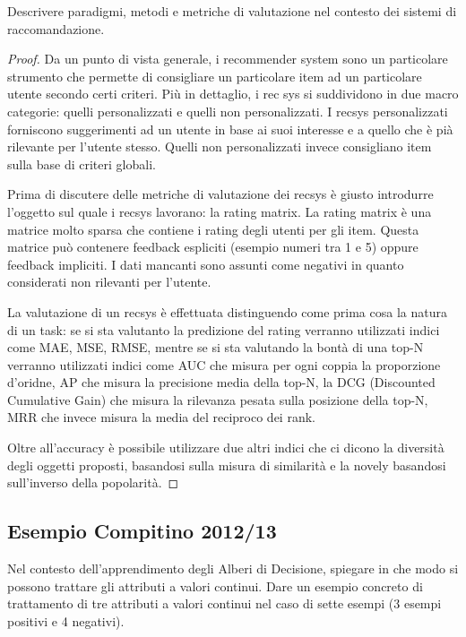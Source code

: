 \documentclass[12pt,a4paper,oneside]{book}
\begin{document}
\begin{exercise}
	Descrivere paradigmi, metodi e metriche di valutazione nel contesto dei sistemi di raccomandazione.
\end{exercise}

\begin{proof}
	Da un punto di vista generale, i recommender system sono un particolare strumento che permette di consigliare un particolare item ad un particolare utente secondo certi criteri. Più in dettaglio, i rec sys si suddividono in due macro categorie: quelli personalizzati e quelli non personalizzati. I recsys personalizzati forniscono suggerimenti ad un utente in base ai suoi interesse e a quello che è pià rilevante per l'utente stesso. Quelli non personalizzati invece consigliano item sulla base di criteri globali.
	
	Prima di discutere delle metriche di valutazione dei recsys è giusto introdurre l'oggetto sul quale i recsys lavorano: la rating matrix. La rating matrix è una matrice molto sparsa che contiene i rating degli utenti per gli item. Questa matrice può contenere feedback espliciti (esempio numeri tra 1 e 5) oppure feedback impliciti. I dati mancanti sono assunti come negativi in quanto considerati non rilevanti per l'utente.
	
	La valutazione di un recsys è effettuata distinguendo come prima cosa la natura di un task: se si sta valutanto la predizione del rating verranno utilizzati indici come MAE, MSE, RMSE, mentre se si sta valutando la bontà di una top-N verranno utilizzati indici come AUC che misura per ogni coppia la proporzione d'oridne, AP che misura la precisione media della top-N, la DCG (Discounted Cumulative Gain) che misura la rilevanza pesata sulla posizione della top-N, MRR che invece misura la media del reciproco dei rank.
	
	Oltre all'accuracy è possibile utilizzare due altri indici che ci dicono la diversità degli oggetti proposti, basandosi sulla misura di similarità e la novely basandosi sull'inverso della popolarità.
\end{proof}

\subsection{Esempio Compitino 2012/13}

\begin{exercise}
	Nel contesto dell’apprendimento degli Alberi di Decisione, spiegare in che modo si possono trattare gli attributi a valori continui.  Dare un esempio concreto di trattamento di tre attributi a valori continui nel caso di sette esempi (3 esempi positivi e 4 negativi).
\end{exercise}
\end{document}

